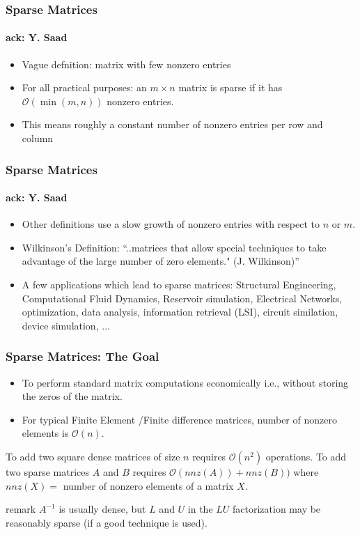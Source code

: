 \documentclass[10pt]{beamer}
\newcommand{\ACK}{\framesubtitle{{\tiny{ack: Y. Saad}}}}
\newcommand{\mO}{{\mathcal{O}}}
\begin{document}
\begin{frame}
\frametitle{Sparse Matrices}
\ACK
\begin{center}
\end{center}
  \begin{itemize}
  \item Vague defnition: matrix with few nonzero entries
  \item For all practical purposes: an $m\times n$ matrix is sparse if
it has $\mO(\min{(m, n)})$ nonzero entries.
  \item This means roughly a constant number of nonzero entries per row and column 
  \end{itemize}
\end{frame}
\begin{frame}
\frametitle{Sparse Matrices}
\ACK
  \begin{itemize}
\item Other definitions use a slow growth of nonzero entries
with respect to $n$ or $m$.

\item Wilkinson's Definition: ``..matrices that allow special
techniques to take advantage of the large number of zero
elements." (J. Wilkinson)''

\item A few applications which lead to sparse matrices:
Structural Engineering, Computational Fluid Dynamics, Reservoir simulation, 
Electrical Networks, optimization, data analysis, 
information retrieval (LSI), circuit similation,
device simulation, $\ldots$
  \end{itemize}
\end{frame}
\begin{frame}
\frametitle{Sparse Matrices: The Goal}
  \begin{itemize}
\item To perform standard matrix computations economically
i.e., without storing the zeros of the matrix.
\item For typical Finite Element /Finite difference matrices,
number of nonzero elements is $\mO(n)$.
  \end{itemize}
\begin{example}
To add two square dense matrices of size $n$
requires $\mO(n^2)$ operations. To add two sparse matrices $A$
and $B$ requires $\mO(nnz(A)) + nnz(B))$ where $nnz(X) =$
number of nonzero elements of a matrix $X$.
\end{example}

\begin{block}{remark}
$A^{-1}$ is usually dense, but $L$ and $U$ in the $LU$
factorization may be reasonably sparse (if a good technique
is used).
\end{block}
\end{frame}
\end{document}
